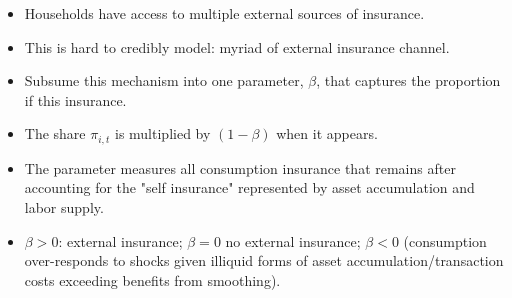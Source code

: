 \documentclass[notes=show]{beamer}
\begin{document}
\begin{frame}%



\begin{itemize}
\item Households have access to multiple external sources of insurance.

\item This is hard to credibly model: myriad of external insurance channel.

\item Subsume this mechanism into one parameter, $\beta $, that captures the
proportion if this insurance.

\item The share $\pi _{i,t}$ is multiplied by $\left( 1-\beta \right) $ when
it appears.

\item The parameter measures all consumption insurance that remains after
accounting for the "self insurance" represented by asset accumulation and
labor supply.

\item $\beta >0$: external insurance; $\beta =0$ no external insurance; $%
\beta <0$ (consumption over-responds to shocks given illiquid forms of asset
accumulation/transaction costs exceeding benefits from smoothing).
\end{itemize}

\transboxout%
\end{frame}%

\bigskip 
\end{document}
